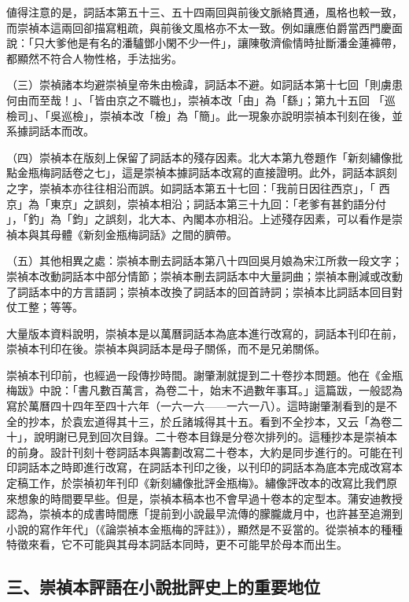 値得注意的是，詞話本第五十三、五十四兩回與前後文脈絡貫通，風格也較一致，而崇禎本這兩回卻描寫粗疏，與前後文風格亦不太一致。例如讓應伯爵當西門慶面說：「只大爹他是有名的潘驢鄧小閑不少一件」，讓陳敬濟偸情時扯斷潘金蓮褲帶，都顯然不符合人物性格，手法拙劣。

（三）崇禎諸本均避崇禎皇帝朱由檢諱，詞話本不避。如詞話本第十七回「則虜患何由而至哉！」、「皆由京之不職也」，崇禎本改「由」為「繇」；第九十五回 「巡檢司」、「吳巡檢」，崇禎本改「檢」為「簡」。此一現象亦說明崇禎本刊刻在後，並系據詞話本而改。

（四）崇禎本在版刻上保留了詞話本的殘存因素。北大本第九卷題作「新刻繡像批點金瓶梅詞話卷之七」，這是崇禎本據詞話本改寫的直接證明。此外，詞話本誤刻之字，崇禎本亦往往相沿而誤。如詞話本第五十七回：「我前日因往西京」，「 西京」為「東京」之誤刻，崇禎本相沿；詞話本第三十九回：「老爹有甚釣語分付 」，「釣」為「鈞」之誤刻，北大本、內閣本亦相沿。上述殘存因素，可以看作是崇禎本與其母體《新刻金瓶梅詞話》之間的臍帶。

（五）其他相異之處：崇禎本刪去詞話本第八十四回吳月娘為宋江所救一段文字；崇禎本改動詞話本中部分情節；崇禎本刪去詞話本中大量詞曲；崇禎本刪減或改動了詞話本中的方言語詞；崇禎本改換了詞話本的回首詩詞；崇禎本比詞話本回目對仗工整；等等。

大量版本資料說明，崇禎本是以萬曆詞話本為底本進行改寫的，詞話本刊印在前，崇禎本刊印在後。崇禎本與詞話本是母子關係，而不是兄弟關係。

崇禎本刊印前，也經過一段傳抄時間。謝肇淛就提到二十卷抄本問題。他在《金瓶梅跋》中說：「書凡數百萬言，為卷二十，始末不過數年事耳。」這篇跋，一般認為寫於萬曆四十四年至四十六年（一六一六——一六一八）。這時謝肇淛看到的是不全的抄本，於袁宏道得其十三，於丘諸城得其十五。看到不全抄本，又云「為卷二十」，說明謝已見到回次目錄。二十卷本目錄是分卷次排列的。這種抄本是崇禎本的前身。設計刊刻十卷詞話本與籌劃改寫二十卷本，大約是同步進行的。可能在刊印詞話本之時即進行改寫，在詞話本刊印之後，以刊印的詞話本為底本完成改寫本定稿工作，於崇禎初年刊印《新刻繡像批評金瓶梅》。繡像評改本的改寫比我們原來想象的時間要早些。但是，崇禎本稿本也不會早過十卷本的定型本。蒲安迪教授認為，崇禎本的成書時間應「提前到小說最早流傳的朦朧歲月中，也許甚至追溯到小說的寫作年代」（《論崇禎本金瓶梅的評註》），顯然是不妥當的。從崇禎本的種種特徵來看，它不可能與其母本詞話本同時，更不可能早於母本而出生。

\subsection*{三、崇禎本評語在小說批評史上的重要地位}

